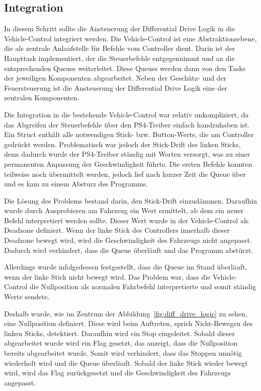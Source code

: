 \subsection{Integration}

In diesem Schritt sollte die Ansteuerung der Differential Drive Logik in die Vehicle-Control integriert werden. Die Vehicle-Control ist eine Abstraktionsebene, die als zentrale Anlaufstelle für Befehle vom Controller dient. Darin ist der Haupttask implementiert, der die Steuerbefehle entgegennimmt und an die entsprechenden Queues weiterleitet. Diese Queues werden dann von den Tasks der jeweiligen Komponenten abgearbeitet. Neben der Geschütz- und der Feuersteuerung ist die Ansteuerung der Differential Drive Logik eine der zentralen Komponenten. \newline

Die Integration in die bestehende Vehicle-Control war relativ unkompliziert, da das Abgreifen der Steuerbefehle über den PS4-Treiber einfach handzuhaben ist. Ein Struct enthält alle notwendigen Stick- bzw. Button-Werte, die am Controller gedrückt werden. Problematisch war jedoch der Stick-Drift des linken Sticks, denn dadurch wurde der PS4-Treiber ständig mit Werten versorgt, was zu einer permanenten Anpassung der Geschwindigkeit führte. Die ersten Befehle konnten teilweise noch übermittelt werden, jedoch lief nach kurzer Zeit die Queue über und es kam zu einem Absturz des Programms. \newline

Die Lösung des Problems bestand darin, den Stick-Drift einzudämmen. Daraufhin wurde durch Ausprobieren am Fahrzeug ein Wert ermittelt, ab dem ein neuer Befehl interpretiert werden sollte. Dieser Wert wurde in der Vehicle-Control als Deadzone definiert. Wenn der linke Stick des Controllers innerhalb dieser Deadzone bewegt wird, wird die Geschwindigkeit des Fahrzeugs nicht angepasst. Dadurch wird verhindert, dass die Queue überläuft und das Programm abstürzt. \newline

Allerdings wurde infolgedessen festgestellt, dass die Queue im Stand überläuft, wenn der linke Stick nicht bewegt wird. Das Problem war, dass die Vehicle-Control die Nullposition als normalen Fahrbefehl interpretierte und somit ständig Werte sendete. \newline

Deshalb wurde, wie im Zentrum der Abbildung~\ref{fig:diff_drive_logic} zu sehen, eine Nullposition definiert. Diese wird beim Auftreten, sprich Nicht-Bewegen des linken Sticks, detektiert. Daraufhin wird ein Stop eingeleitet. Sobald dieser abgearbeitet wurde wird ein Flag gesetzt, das anzeigt, dass die Nullposition bereits abgearbeitet wurde. Somit wird verhindert, dass das Stoppen unnötig wiederholt wird und die Queue überläuft. Sobald der linke Stick wieder bewegt wird, wird das Flag zurückgesetzt und die Geschwindigkeit des Fahrzeugs angepasst. \newline

